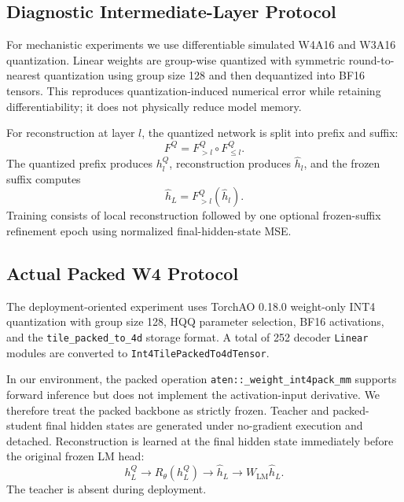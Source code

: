 \documentclass[11pt]{article}
\begin{document}
\subsection{Diagnostic Intermediate-Layer Protocol}

For mechanistic experiments we use differentiable simulated W4A16 and W3A16 quantization. Linear weights are group-wise quantized with symmetric round-to-nearest quantization using group size 128 and then dequantized into BF16 tensors. This reproduces quantization-induced numerical error while retaining differentiability; it does not physically reduce model memory.

For reconstruction at layer $l$, the quantized network is split into prefix and suffix:
\begin{equation}
 F^Q = F_{>l}^Q\circ F_{\le l}^Q.
\end{equation}
The quantized prefix produces $h_l^Q$, reconstruction produces $\hat h_l$, and the frozen suffix computes
\begin{equation}
 \hat h_L = F_{>l}^Q(\hat h_l).
\end{equation}
Training consists of local reconstruction followed by one optional frozen-suffix refinement epoch using normalized final-hidden-state MSE.

\subsection{Actual Packed W4 Protocol}

The deployment-oriented experiment uses TorchAO 0.18.0 weight-only INT4 quantization with group size 128, HQQ parameter selection, BF16 activations, and the \texttt{tile\_packed\_to\_4d} storage format. A total of 252 decoder \texttt{Linear} modules are converted to \texttt{Int4TilePackedTo4dTensor}.

In our environment, the packed operation \texttt{aten::\_weight\_int4pack\_mm} supports forward inference but does not implement the activation-input derivative. We therefore treat the packed backbone as strictly frozen. Teacher and packed-student final hidden states are generated under no-gradient execution and detached. Reconstruction is learned at the final hidden state immediately before the original frozen LM head:
\begin{equation}
 h_L^Q \rightarrow R_\theta(h_L^Q) \rightarrow \hat h_L \rightarrow W_{\mathrm{LM}}\hat h_L.
\end{equation}
The teacher is absent during deployment.
\end{document}
